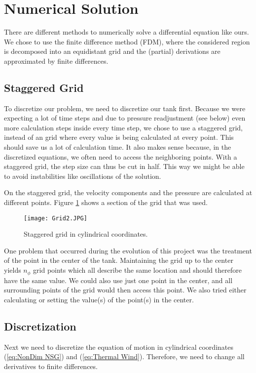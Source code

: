 \documentclass[12pt, a4paper]{article} %
\newcommand{\todoEnglish}{\todo[color=red!20]}
\begin{document}
	\newpage		
\section{Numerical Solution
}
	There are different methods to numerically solve a differential equation like ours. We chose to use the finite difference method (FDM), where the considered region is decomposed into an equidistant grid and the (partial) derivations are approximated by finite differences.
	
	
	\subsection{Staggered Grid} %
		To discretize our problem, we need to discretize our tank first. Because we were expecting a lot of time steps and due to pressure readjustment (see below) even more calculation steps inside every time step, we chose to use a staggered grid, instead of an grid where every value is being calculated at every point. This should save us a lot of calculation time. It also makes sense because, in the discretized equations, we often need to access the neighboring points. With a staggered grid, the step size can thus be cut in half. This way we might be able to avoid instabilities like oscillations of the solution.
		
		On the staggered grid, the velocity components and the pressure are calculated at different points. Figure \ref{fig:Grid} shows a section of the grid that was used.
		
		\begin{figure}[H]
			\centering
			\texttt{[image: Grid2.JPG]}
			\caption{Staggered grid in cylindrical coordinates.} %
			\label{fig:Grid}
		\end{figure}
		
		One problem that occurred during the evolution of this project was the treatment of the point in the center of the tank. Maintaining the grid up to the center yields $n_\phi$ grid points which all describe the same location and should therefore have the same value. We could also use just one point in the center, and all surrounding points of the grid would then access this point. We also tried either calculating or setting the value(s) of the point(s) in the center.
		\todoEnglish{this doesn't sound good yet.}
		
	\subsection{Discretization} %
		Next we need to discretize the equation of motion in cylindrical coordinates (\ref{eq:NonDim NSG}) and (\ref{eq:Thermal Wind}). Therefore, we need to change all derivatives to finite differences. 
		
\end{document}
